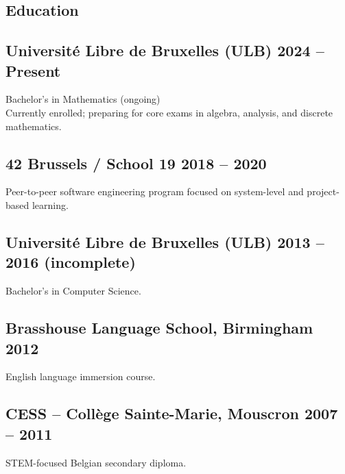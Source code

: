 \documentclass[11pt,a4paper]{article}
\begin{document}
\begin{paracol}{2}
\vspace{1em}

\section*{Education}
\subsection{Université Libre de Bruxelles (ULB) \hfill 2024 -- Present}
Bachelor's in Mathematics (ongoing) \\
Currently enrolled; preparing for core exams in algebra, analysis, and discrete mathematics.

\subsection{42 Brussels / School 19 \hfill 2018 -- 2020}
Peer-to-peer software engineering program focused on system-level and project-based learning.

\subsection{Université Libre de Bruxelles (ULB) \hfill 2013 -- 2016 (incomplete)}
Bachelor's in Computer Science.

\subsection{Brasshouse Language School, Birmingham \hfill 2012}
English language immersion course.

\subsection{CESS – Collège Sainte-Marie, Mouscron \hfill 2007 -- 2011}
STEM-focused Belgian secondary diploma.

\end{paracol}
\end{document}
